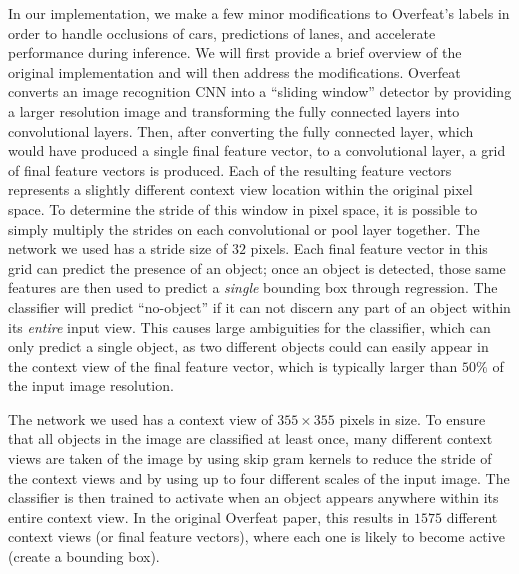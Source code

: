 \documentclass[journal]{IEEEtran}
\begin{document}
In our implementation, we make a few minor modifications to Overfeat's labels in order to handle occlusions of cars, predictions of lanes, and accelerate performance during inference. We will first provide a brief overview of the original implementation and will then address the modifications. Overfeat converts an image recognition CNN into a ``sliding window'' detector by providing a larger resolution image and transforming the fully connected layers into convolutional layers. Then, after converting the fully connected layer, which would have produced a single final feature vector, to a convolutional layer, a grid of final feature vectors is produced. Each of the resulting feature vectors represents a slightly different context view location within the original pixel space. To determine the stride of this window in pixel space, it is possible to simply multiply the strides on each convolutional or pool layer together. The network we used has a stride size of $32$ pixels. Each final feature vector in this grid can predict the presence of an object; once an object is detected, those same features are then used to predict a \textit{single} bounding box through regression. The classifier will predict ``no-object'' if it can not discern any part of an object within its \textit{entire} input view. This causes large ambiguities for the classifier, which can only predict a single object, as two different objects could can easily appear in the context view of the final feature vector, which is typically larger than $50\%$ of the input image resolution.

The network we used has a context view of $355 \times 355$ pixels in size. To ensure that all objects in the image are classified at least once, many different context views are taken of the image by using skip gram kernels to reduce the stride of the context views and by using up to four different scales of the input image. The classifier is then trained to activate when an object appears anywhere within its entire context view. In the original Overfeat paper, this results in $1575$ different context views (or final feature vectors), where each one is likely to become active (create a bounding box).
\end{document}

